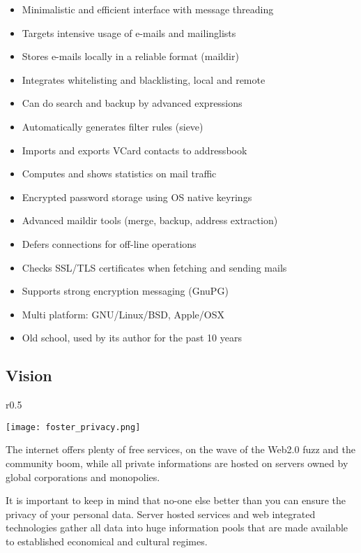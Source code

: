 \documentclass[a4,onecolumn,portrait]{article}
\begin{document}
\footnotesize
\begin{itemize}
\item Minimalistic and efficient interface with message threading
\item Targets intensive usage of e-mails and mailinglists
\item Stores e-mails locally in a reliable format (maildir)
\item Integrates whitelisting and blacklisting, local and remote
\item Can do search and backup by advanced expressions
\item Automatically generates filter rules (sieve)
\item Imports and exports VCard contacts to addressbook
\item Computes and shows statistics on mail traffic
\item Encrypted password storage using OS native keyrings
\item Advanced maildir tools (merge, backup, address extraction)
\item Defers connections for off-line operations
\item Checks SSL/TLS certificates when fetching and sending mails
\item Supports strong encryption messaging (GnuPG)
\item Multi platform: GNU/Linux/BSD, Apple/OSX
\item Old school, used by its author for the past 10 years
\end{itemize}
\normalsize
\subsection{Vision}
\label{sec-1-2}

\begin{wrapfigure}{r}{0.5\textwidth}
  \begin{center}
    \texttt{[image: foster\_privacy.png]}
  \end{center}
\end{wrapfigure}
The internet offers plenty of free services, on the wave of the Web2.0
fuzz and the community boom, while all private informations are hosted
on servers owned by global corporations and monopolies.

It is important to keep in mind that no-one else better than you can
ensure the privacy of your personal data. Server hosted services and
web integrated technologies gather all data into huge information
pools that are made available to established economical and cultural
regimes.
\end{document}
